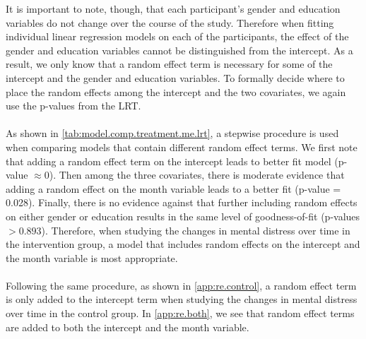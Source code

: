 It is important to note, though, that each participant's gender and education variables do not change over the course of the study. Therefore when fitting individual linear regression models on each of the participants, the effect of the gender and education variables cannot be distinguished from the intercept. As a result, we only know that a random effect term is necessary for some of the intercept and the gender and education variables. To formally decide where to place the random effects among the intercept and the two covariates, we again use the p-values from the LRT.\\\\
As shown in \cref{tab:model.comp.treatment.me.lrt}, a stepwise procedure is used when comparing models that contain different random effect terms. We first note that adding a random effect term on the intercept leads to better fit model (p-value $\approx 0$). Then among the three covariates, there is moderate evidence that adding a random effect on the month variable leads to a better fit (p-value = 0.028). Finally, there is no evidence against that further including random effects on either gender or education results in the same level of goodness-of-fit (p-values $>0.893$). Therefore, when studying the changes in mental distress over time in the intervention group, a model that includes random effects on the intercept and the month variable is most appropriate.\\\\
Following the same procedure, as shown in \cref{app:re.control}, a random effect term is only added to the intercept term when studying the changes in mental distress over time in the control group. In \cref{app:re.both}, we see that random effect terms are added to both the intercept and the month variable.
